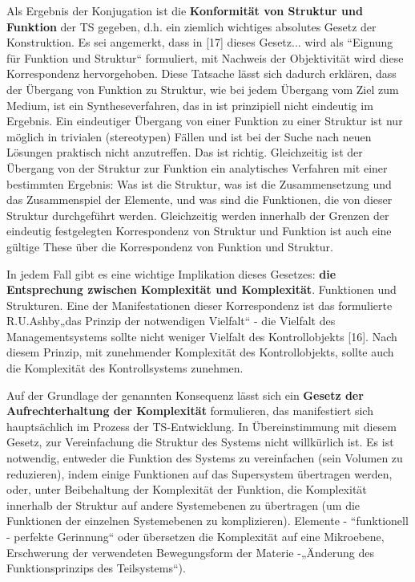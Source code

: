 \documentclass[11pt,a4paper]{article}
\begin{document}
Als Ergebnis der Konjugation ist die \textbf{Konformität von Struktur und
  Funktion} der TS gegeben, d.h.  ein ziemlich wichtiges absolutes Gesetz der
Konstruktion. Es sei angemerkt, dass in [17] dieses Gesetz...  wird als
“Eignung für Funktion und Struktur“ formuliert, mit Nachweis der Objektivität
wird diese Korrespondenz hervorgehoben. Diese Tatsache lässt sich dadurch
erklären, dass der Übergang von Funktion zu Struktur, wie bei jedem Übergang
vom Ziel zum Medium, ist ein Syntheseverfahren, das in ist prinzipiell nicht
eindeutig im Ergebnis. Ein eindeutiger Übergang von einer Funktion zu einer
Struktur ist nur möglich in trivialen (stereotypen) Fällen und ist bei der
Suche nach neuen Lösungen praktisch nicht anzutreffen. Das ist richtig.
Gleichzeitig ist der Übergang von der Struktur zur Funktion ein analytisches
Verfahren mit einer bestimmten Ergebnis: Was ist die Struktur, was ist die
Zusammensetzung und das Zusammenspiel der Elemente, und was sind die
Funktionen, die von dieser Struktur durchgeführt werden. Gleichzeitig werden
innerhalb der Grenzen der eindeutig festgelegten Korrespondenz von Struktur
und Funktion ist auch eine gültige These über die Korrespondenz von Funktion
und Struktur.

In jedem Fall gibt es eine wichtige Implikation dieses Gesetzes: \textbf{die
  Entsprechung zwischen Komplexität und Komplexität}.  Funktionen und
Strukturen. Eine der Manifestationen dieser Korrespondenz ist das formulierte
R.U.Ashby„das Prinzip der notwendigen Vielfalt“ - die Vielfalt des
Managementsystems sollte nicht weniger Vielfalt des Kontrollobjekts [16]. Nach
diesem Prinzip, mit zunehmender Komplexität des Kontrollobjekts, sollte auch
die Komplexität des Kontrollsystems zunehmen.

Auf der Grundlage der genannten Konsequenz lässt sich ein \textbf{Gesetz der
  Aufrechterhaltung der Komplexität} formulieren, das manifestiert sich
hauptsächlich im Prozess der TS-Entwicklung. In Übereinstimmung mit diesem
Gesetz, zur Vereinfachung die Struktur des Systems nicht willkürlich ist. Es
ist notwendig, entweder die Funktion des Systems zu vereinfachen (sein Volumen
zu reduzieren), indem einige Funktionen auf das Supersystem übertragen werden,
oder, unter Beibehaltung der Komplexität der Funktion, die Komplexität
innerhalb der Struktur auf andere Systemebenen zu übertragen (um die
Funktionen der einzelnen Systemebenen zu komplizieren).  Elemente -
“funktionell - perfekte Gerinnung“ oder übersetzen die Komplexität auf eine
Mikroebene, Erschwerung der verwendeten Bewegungsform der Materie -„Änderung
des Funktionsprinzips des Teilsystems“).
\end{document}
